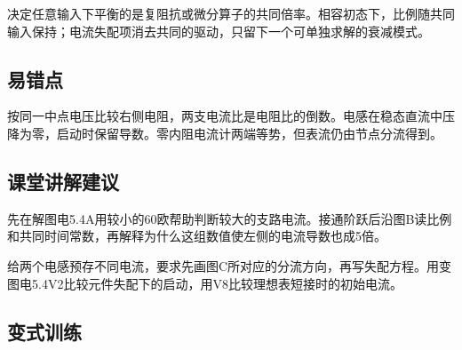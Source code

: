 \documentclass[UTF8,fontset=fandol,a4paper,11pt]{ctexart}
\begin{document}
决定任意输入下平衡的是复阻抗或微分算子的共同倍率。相容初态下，比例随共同输入保持；电流失配项消去共同的驱动，只留下一个可单独求解的衰减模式。



\subsection*{易错点}

按同一中点电压比较右侧电阻，两支电流比是电阻比的倒数。电感在稳态直流中压降为零，启动时保留导数。零内阻电流计两端等势，但表流仍由节点分流得到。



\subsection*{课堂讲解建议}

先在解图电5.4A用较小的60欧帮助判断较大的支路电流。接通阶跃后沿图B读比例和共同时间常数，再解释为什么这组数值使左侧的电流导数也成5倍。

给两个电感预存不同电流，要求先画图C所对应的分流方向，再写失配方程。用变图电5.4V2比较元件失配下的启动，用V8比较理想表短接时的初始电流。


\subsection*{变式训练}
\end{document}
